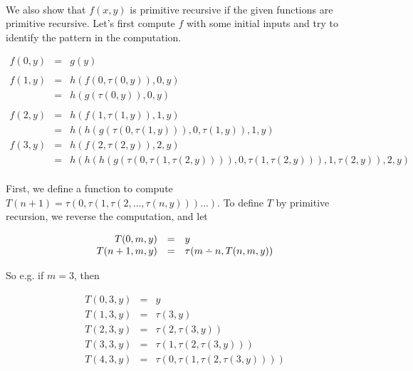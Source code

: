 \documentclass{article}
\providecommand{\dotdiv}{%
  \mathbin{%
    \vphantom{+}%
    \text{%
      \mathsurround=0pt %
      \ooalign{%
        \noalign{\kern-.35ex}%
        \hidewidth$\smash{\cdot}$\hidewidth\cr %
        \noalign{\kern.35ex}%
        $-$\cr %
      }%
    }%
  }%
}
\begin{document}
\paragraph{} We also show that $f(x,y)$ is primitive recursive if the given
functions are primitive recursive. Let's first compute $f$ with some
initial inputs and try to identify the pattern in the computation.

\[
\begin{array}{rcl}
  f(0,y) & = & g(y) \\ \\
  
  f(1, y) & = & h(f(0,\tau (0,y)), 0, y) \\
  & = & h(g(\tau (0,y)), 0, y) \\ \\

  f(2, y) & = & h(f(1,\tau (1,y)), 1, y) \\
  & = & h(h(g(\tau (0, \tau (1,y))),0,\tau (1,y)), 1, y) \\

  f(3, y) & = & h(f(2,\tau (2,y)), 2, y) \\
  & = & h(h(h(g(\tau (0, \tau (1, \tau (2, y)))),0,\tau (1, \tau (2, y))), 1, \tau (2,y)), 2, y)
\end{array} 
\]

\paragraph{} First, we define a function to compute $T(n+1) = \tau (0, \tau (1, \tau (2, \ldots, \tau (n, y))) \ldots )$. To define $T$ by primitive recursion, we reverse the computation, and let

\[
\begin{array}{rcl}
  T(0,m,y) & = & y \\
  T(n+1,m,y) & = & \tau (m \dotdiv n, T(n,m,y))
\end{array} 
\]

So e.g. if $m=3$, then

\[
\begin{array}{rcl}
  T(0,3,y) & = & y \\
  T(1,3,y) & = & \tau(3,y) \\
  T(2,3,y) & = & \tau(2, \tau (3,y)) \\
  T(3,3,y) & = & \tau(1, \tau(2, \tau (3,y))) \\
  T(4,3,y) & = & \tau(0,\tau(1, \tau(2, \tau (3,y)))) \\
\end{array} 
\]
\end{document}
